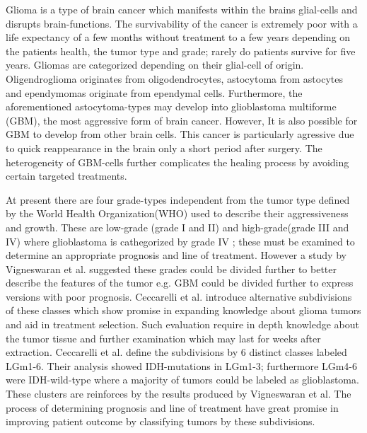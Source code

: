 Glioma is a type of brain cancer which manifests within the brains glial-cells and disrupts brain-functions. The survivability of the cancer is extremely poor with a life expectancy of a few months without treatment to a few years depending on the patients health, the tumor type and grade; rarely do patients survive for five years\cite{gallego2015nonsurgical}\cite{bleeker2012recent}. Gliomas are categorized depending on their glial-cell of origin. Oligendroglioma originates from oligodendrocytes, astocytoma from astocytes and ependymomas originate from ependymal cells. Furthermore, the aforementioned astocytoma-types may develop into glioblastoma multiforme (GBM), the most aggressive form of brain cancer. However, It is also possible for GBM to develop from other brain cells. This cancer is particularly agressive due to quick reappearance in the brain only a short period after surgery\cite{gallego2015nonsurgical}. The heterogeneity of GBM-cells further complicates the healing process by avoiding certain targeted treatments\cite{dirkse2019stem}.

At present there are four grade-types independent from the tumor type defined by the World Health Organization(WHO) used to describe their aggressiveness and growth. These are low-grade (grade I and II) and high-grade(grade III and IV) where glioblastoma is cathegorized by grade IV \cite{bleeker2012recent}\cite{gradesandpriorsubdivision}; these must be examined to determine an appropriate prognosis and line of treatment. However a study by Vigneswaran et al. suggested these grades could be divided further to better describe the features of the tumor e.g. GBM could be divided further to express versions with poor prognosis. Ceccarelli et al.\cite{cellsubsets} introduce alternative subdivisions of these classes which show promise in expanding knowledge about glioma tumors and aid in treatment selection. Such evaluation require in depth knowledge about the tumor tissue and  further examination which may last for weeks after extraction. Ceccarelli et al. define the subdivisions by 6 distinct classes labeled LGm1-6. Their analysis showed IDH-mutations in LGm1-3; furthermore LGm4-6 were IDH-wild-type where a majority of tumors could be labeled as glioblastoma. These clusters are reinforces by the results produced by Vigneswaran et al. The process of determining prognosis and line of treatment have great promise in improving patient outcome by classifying tumors by these subdivisions.


